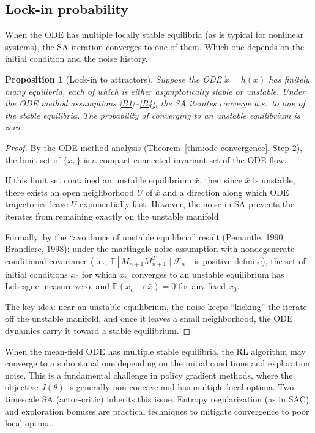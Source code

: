 \documentclass[11pt,a4paper]{article}
\theoremstyle{definition}
\theoremstyle{plain}
\newtheorem{proposition}[theorem]{Proposition}
\theoremstyle{remark}
\newcommand{\Prob}{\mathbb{P}}
\newcommand{\E}{\mathbb{E}}
\begin{document}
\subsection{Lock-in probability}

When the ODE has multiple locally stable equilibria (as is typical for nonlinear
systems), the SA iteration converges to one of them. Which one depends on the initial
condition and the noise history.

\begin{proposition}[Lock-in to attractors]
\label{prop:lock-in}
Suppose the ODE $\dot{x} = h(x)$ has finitely many equilibria, each of which is
either asymptotically stable or unstable. Under the ODE method assumptions
\ref{B1}--\ref{B4}, the SA iterates converge a.s.\ to one of the stable equilibria.
The probability of converging to an unstable equilibrium is zero.
\end{proposition}

\begin{proof}
By the ODE method analysis (Theorem~\ref{thm:ode-convergence}, Step 2), the
limit set of $\{x_n\}$ is a compact connected invariant set of the ODE flow.

If this limit set contained an unstable equilibrium $\bar{x}$, then since $\bar{x}$
is unstable, there exists an open neighborhood $U$ of $\bar{x}$ and a direction
along which ODE trajectories leave $U$ exponentially fast. However, the noise in
SA prevents the iterates from remaining exactly on the unstable manifold.

Formally, by the ``avoidance of unstable equilibria'' result (Pemantle, 1990;
Brandiere, 1998): under the martingale noise assumption with nondegenerate
conditional covariance (i.e., $\E[M_{n+1}M_{n+1}^T \mid \mathcal{F}_n]$ is
positive definite), the set of initial conditions $x_0$ for which $x_n$ converges
to an unstable equilibrium has Lebesgue measure zero, and $\Prob(x_n \to \bar{x}) = 0$
for any fixed $x_0$.

The key idea: near an unstable equilibrium, the noise keeps ``kicking'' the iterate
off the unstable manifold, and once it leaves a small neighborhood, the ODE dynamics
carry it toward a stable equilibrium.
\end{proof}

\begin{warning}
When the mean-field ODE has multiple stable equilibria, the RL algorithm may converge
to a suboptimal one depending on the initial conditions and exploration noise. This is
a fundamental challenge in policy gradient methods, where the objective $J(\theta)$ is
generally non-concave and has multiple local optima. Two-timescale SA (actor-critic)
inherits this issue. Entropy regularization (as in SAC) and exploration bonuses are
practical techniques to mitigate convergence to poor local optima.
\end{warning}
\end{document}
